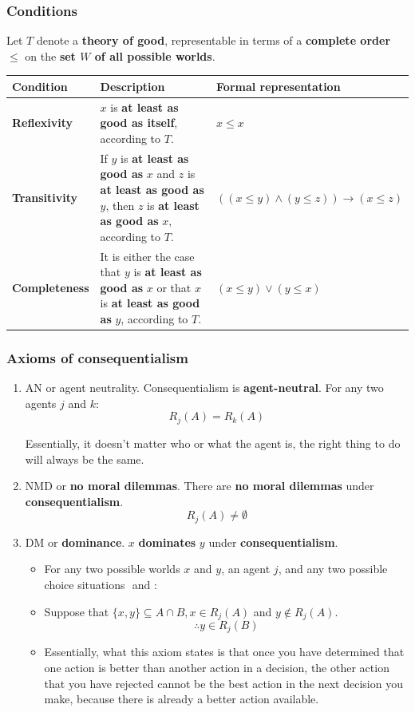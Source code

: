 \documentclass[11pt]{article}
\begin{document}
\subsubsection{Conditions}
\label{sec:org5dd4e76}
Let \(T\) denote a \textbf{theory of good}, representable in terms of a \textbf{complete order} \(\le\) on the \textbf{set \(W\) of all possible worlds}.

\begin{center}
\begin{tabularx}{\textwidth}{|X|X|X|}
\hline
Condition & Description & Formal representation\\
\hline
\textbf{Reflexivity} & \(x\) is \textbf{at least as good as itself}, according to \(T\). & \(x \le x\)\\
\hline
\textbf{Transitivity} & If \(y\) is \textbf{at least as good as} \(x\) and \(z\) is \textbf{at least as good as} \(y\), then \(z\) is \textbf{at least as good as} \(x\), according to \(T\). & \(((x \le y) \wedge (y \le z)) \rightarrow (x \le z)\)\\
\hline
\textbf{Completeness} & It is either the case that \(y\) is \textbf{at least as good as} \(x\) or that \(x\) is \textbf{at least as good as} \(y\), according to \(T\). & \((x \le y) \vee (y \le x)\)\\
\hline
\end{tabularx}
\end{center}

 \newpage
\subsubsection{Axioms of consequentialism}
\label{sec:org7294e75}
\begin{enumerate}
\item AN or agent neutrality. Consequentialism is \textbf{agent-neutral}.
For any two agents \(j\) and \(k\):
\[R_j (A) = R_k (A)\]

Essentially, it doesn't matter who or what the agent is, the right thing to do will always be the same.

\item NMD or \textbf{no moral dilemmas}. There are \textbf{no moral dilemmas} under \textbf{consequentialism}.
\[R_j (A) \ne \emptyset\]

\item DM or \textbf{dominance}. \(x\) \textbf{dominates} \(y\) under \textbf{consequentialism}.
\begin{itemize}
\item For any two possible worlds \(x\) and \(y\), an agent \(j\), and any two possible choice situations \(<j, A>\) and \(<j, B>\):
\item Suppose that \(\{x, y\} \subseteq A \cap B, x \in R_j (A)\) and \(y \notin R_j (A)\).
\[\therefore y \in R_j (B)\]
\item Essentially, what this axiom states is that once you have determined that one action is better than another action in a decision, the other action that you have rejected cannot be the best action in the next decision you make, because there is already a better action available.
\end{itemize}
\end{enumerate}
\end{document}
